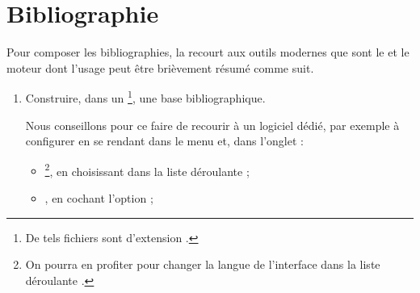 \section{Bibliographie}
\label{sec-bibliographie}

Pour composer les bibliographies, la \nwejmauthorcl{} recourt aux outils
modernes que sont le  et le moteur  dont
l'usage peut être brièvement résumé comme suit\autocite[Pour plus de détails,
cf. par exemple][en français]{Bitouze}.
\begin{enumerate}
\item Construire, dans un \footnote{De tels
    fichiers sont d'extension .}, une base bibliographique.

  Nous conseillons pour ce faire de recourir à un logiciel dédié, par exemple
  \href{http://jabref.sourceforge.net/}{} à configurer en se
  rendant dans le menu  et, dans l'onglet :
  \begin{itemize}
  \item {}\footnote{On pourra en profiter pour changer la langue de
      l'interface dans la liste déroulante .}, en choisissant
     dans la liste déroulante  ;
  \item {}, en cochant l'option  ;
  \end{itemize}


\end{enumerate}
